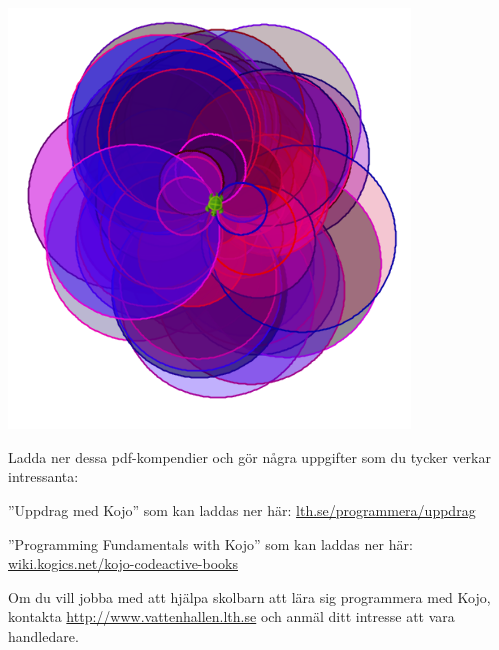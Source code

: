 \includegraphics[width=0.8\textwidth]{../img/kojo/random-color-circles.png}


\Task Ladda ner dessa pdf-kompendier och gör några uppgifter som du tycker verkar intressanta:

\Subtask ''Uppdrag med Kojo'' som kan laddas ner här: \href{http://lth.se/programmera/uppdrag}{lth.se/programmera/uppdrag}

\Subtask ''Programming Fundamentals with Kojo'' som kan laddas ner här:\\
 \href{http://wiki.kogics.net/kojo-codeactive-books}{wiki.kogics.net/kojo-codeactive-books}
 
\Task Om du vill jobba med att hjälpa skolbarn att lära sig programmera med Kojo, kontakta \url{http://www.vattenhallen.lth.se} och anmäl ditt intresse att vara handledare. 
